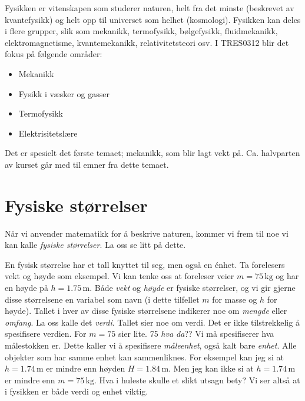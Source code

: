 Fysikken er vitenskapen som studerer naturen, helt fra det minste (beskrevet av kvantefysikk) og helt opp til universet som helhet (kosmologi). Fysikken kan deles i flere grupper, slik som mekanikk, termofysikk, bølgefysikk, fluidmekanikk, elektromagnetisme, kvantemekanikk, relativitetsteori osv. I TRES0312 blir det fokus på følgende områder:
\begin{itemize}
    \item Mekanikk
    \vspace{-0.75em}
    \item Fysikk i væsker og gasser
    \vspace{-0.75em}
    \item Termofysikk
    \vspace{-0.75em}
    \item Elektrisitetslære
\end{itemize}
Det er spesielt det første temaet; mekanikk, som blir lagt vekt på. Ca. halvparten av kurset går med til emner fra dette temaet.

\section{Fysiske størrelser}
Når vi anvender matematikk for å beskrive naturen, kommer vi frem til noe vi kan kalle \textit{fysiske størrelser}. La oss se litt på dette.

En fysisk størrelse har et tall knyttet til seg, men også en énhet. Ta forelesers vekt og høyde som eksempel. Vi kan tenke oss at foreleser veier $m=75\,\textrm{kg}$ og har en høyde på $h=1.75\,\textrm{m}$. Både \textit{vekt} og \textit{høyde} er fysiske størrelser, og vi gir gjerne disse størrelsene en variabel som navn (i dette tilfellet $m$ for masse og $h$ for høyde). Tallet i hver av disse fysiske størrelsene indikerer noe om \textit{mengde} eller \textit{omfang}. La oss kalle det \textit{verdi}.  Tallet sier noe om verdi.
Det er ikke tilstrekkelig å spesifisere verdien. For $m=75$ sier lite. 75 \textit{hva da}?? Vi må spesifiserer hva målestokken er. Dette kaller vi å spesifisere \textit{måleenhet}, også kalt bare \textit{enhet}. Alle objekter som har samme enhet kan sammenliknes. For eksempel kan jeg si at $h=1.74\,\textrm{m}$ er mindre enn høyden $H=1.84\,\textrm{m}$. Men jeg kan ikke si at $h=1.74\,\textrm{m}$ er mindre enn $m=75\,\textrm{kg}$. Hva i huleste skulle et slikt utsagn bety? Vi ser altså at i fysikken er både verdi og enhet viktig.


